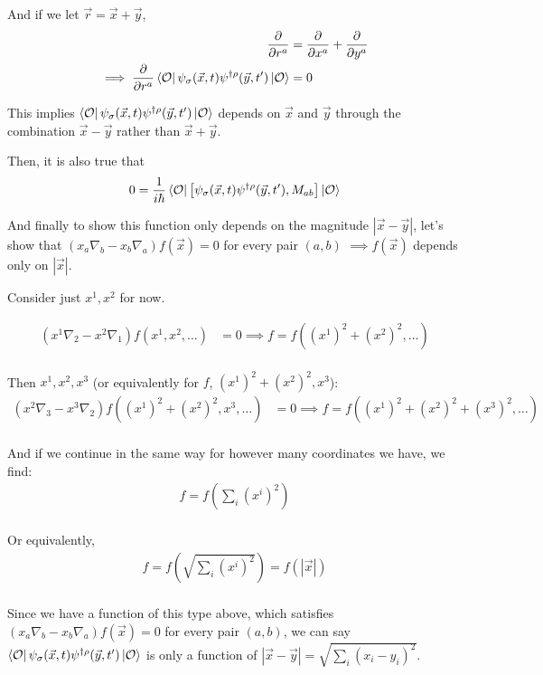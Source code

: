 And if we let $\vec{r} = \vec{x} + \vec{y}$,
\begin{align*}
    \frac{\partial}{\partial r^a} &= \frac{\partial}{\partial x^a} + \frac{\partial}{\partial y^a} \\
    \implies \frac{\partial}{\partial r^a}\bra{\mathcal{O}} \psi_\sigma(\vec{x},t)\psi^{\dagger\rho}(\vec{y},t') \ket{\mathcal{O}} &= 0 \\
\end{align*}

This implies $\bra{\mathcal{O}} \psi_\sigma(\vec{x},t)\psi^{\dagger\rho}(\vec{y},t') \ket{\mathcal{O}}$ depends on $\vec{x}$ and $\vec{y}$ through the combination $\vec{x}-\vec{y}$ rather than $\vec{x}+\vec{y}$.

Then, it is also true that  
\begin{align*}
    0 &= \frac{1}{i\hbar} \bra{\mathcal{O}} \left[\psi_\sigma(\vec{x},t)\psi^{\dagger\rho}(\vec{y},t'), M_{ab}\right] \ket{\mathcal{O}} \\ 
\end{align*}

And finally to show this function only depends on the magnitude $|\vec{x}-\vec{y}|$, let's show that $(x_a\nabla_b - x_b\nabla_a)f(\vec{x}) = 0$ for every pair $(a,b)$ $\implies f(\vec{x})$ depends only on $|\vec{x}|$.

Consider just $x^1, x^2$ for now.

\begin{align*}
    (x^1\nabla_2 - x^2\nabla_1)f(x^1,x^2,\ldots) &= 0 \implies f = f((x^1)^2 + (x^2)^2,\ldots) \\
\end{align*}

Then $x^1, x^2, x^3$ (or equivalently for $f$, $(x^1)^2 + (x^2)^2, x^3$):
\begin{align*}
    (x^2\nabla_3 - x^3\nabla_2)f((x^1)^2 + (x^2)^2, x^3,\ldots) &= 0 \implies f = f((x^1)^2 + (x^2)^2 + (x^3)^2,\ldots) \\
\end{align*}

And if we continue in the same way for however many coordinates we have, we find:
\begin{align*}
    f = f(\sum_i (x^i)^2) \\
\end{align*}
    
Or equivalently,
\begin{align*}
    f = f(\sqrt{\sum_i (x^i)^2}) = f(|\vec{x}|) \\
\end{align*}

Since we have a function of this type above, which satisfies $(x_a\nabla_b - x_b\nabla_a)f(\vec{x}) = 0$ for every pair $(a,b)$, we can say $\bra{\mathcal{O}}\psi_\sigma(\vec{x},t)\psi^{\dagger\rho}(\vec{y},t')\ket{\mathcal{O}}$ is only a function of $|\vec{x}-\vec{y}| = \sqrt{\sum_i (x_i-y_i)^2}$.
